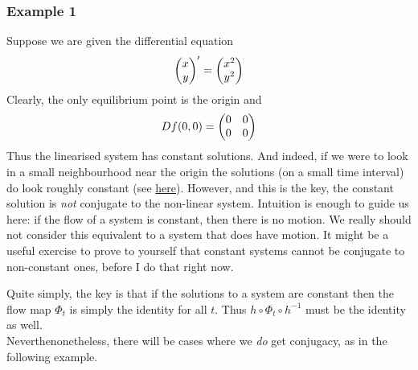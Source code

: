 \subsubsection{Example 1}
Suppose we are given the differential equation
$$ \begin{pmatrix} x\\y \end{pmatrix}' = \begin{pmatrix} x^2 \\ y^2 \end{pmatrix} $$
Clearly, the only equilibrium point is the origin and 
$$ Df(0, 0) = \begin{pmatrix} 0 & 0\\0 & 0 \end{pmatrix} $$
Thus the linearised system has constant solutions. And indeed, if we were to look in a small neighbourhood near the origin the solutions (on a small time interval) do look roughly constant (see \href{https://anvaka.github.io/fieldplay/?dt=0.02&fo=0.995&dp=0.009&cm=1&cx=-0.05585000000000001&cy=0.0063499999999999945&w=1.0917&h=1.0917&vf=\%2F\%2F\%20p.x\%20and\%20p.y\%20are\%20current\%20coordinates\%0A\%2F\%2F\%20v.x\%20and\%20v.y\%20is\%20a\%20velocity\%20at\%20point\%20p\%0Avec2\%20get_velocity\%28vec2\%20p\%29\%20\%7B\%0A\%20\%20vec2\%20v\%20\%3D\%20vec2\%280.\%2C\%200.\%29\%3B\%0A\%0A\%20\%20\%2F\%2F\%20change\%20this\%20to\%20get\%20a\%20new\%20vector\%20field\%0A\%20\%20v.x\%20\%3D\%20p.x\%20*\%20p.x\%3B\%0A\%20\%20v.y\%20\%3D\%20p.y\%20*\%20p.y\%3B\%0A\%0A\%20\%20return\%20v\%3B\%0A\%7D&pc=10000&code=\%2F\%2F\%20p.x\%20and\%20p.y\%20are\%20current\%20coordinates\%0A\%2F\%2F\%20v.x\%20and\%20v.y\%20is\%20a\%20velocity\%20at\%20point\%20p\%0Avec2\%20get_velocity\%28vec2\%20p\%29\%20\%7B\%0A\%20\%20vec2\%20v\%20\%3D\%20vec2\%280.\%2C\%200.\%29\%3B\%0A\%0A\%20\%20\%2F\%2F\%20change\%20this\%20to\%20get\%20a\%20new\%20vector\%20field\%0A\%20\%20v.x\%20\%3D\%20p.x\%20*\%20p.x\%3B\%0A\%20\%20v.y\%20\%3D\%20p.y\%20*\%20p.y\%3B\%0A\%0A\%20\%20return\%20v\%3B\%0A\%7D}{here}). However, and this is the key, the constant solution is \textit{not} conjugate to the non-linear system. Intuition is enough to guide us here: if the flow of a system is constant, then there is no motion. We really should not consider this equivalent to a system that does have motion. It might be a useful exercise to prove to yourself that constant systems cannot be conjugate to non-constant ones, before I do that right now.

Quite simply, the key is that if the solutions to a system are constant then the flow map $\Phi_t$ is simply the identity for all $t$. Thus $h \circ \Phi_t \circ h^{-1}$ must be the identity as well.\\


Neverthenonetheless, there will be cases where we \textit{do} get conjugacy, as in the following example.

